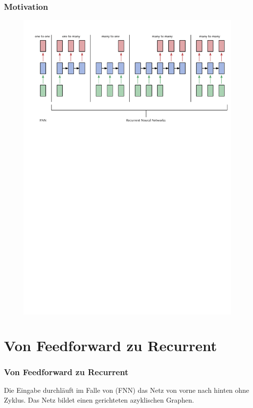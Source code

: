 \documentclass[german,aspectratio=169]{beamer}
\begin{document}
\begin{frame}
	\frametitle{Motivation}
	\begin{figure}
		\includegraphics[width=\textwidth]{FNN-vs-RNN}
	\end{figure}
\end{frame}


\section{Von Feedforward zu Recurrent}
\begin{frame}
	\frametitle{Von Feedforward zu Recurrent}
	Die Eingabe durchläuft im Falle von  (FNN) das Netz von vorne nach hinten ohne Zyklus.
	Das Netz bildet einen gerichteten azyklischen Graphen.
\end{frame}
\end{document}

